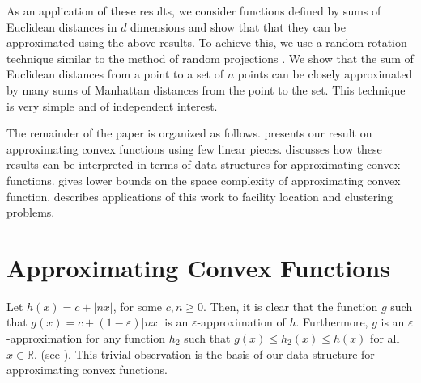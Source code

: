 \documentclass[charterfonts,lotsofwhite]{patmorin}
\newcommand{\eps}{\varepsilon}
\newcommand{\Real}{\mathbb{R}}
\begin{document}
As an application of these results, we consider functions defined by
sums of Euclidean distances in $d$ dimensions and show that that they
can be approximated using the above results.  To achieve this, we use
a random rotation technique similar to the method of random
projections \cite{i01}.  We show that the sum of Euclidean distances
from a point to a set of $n$ points can be closely approximated by
many sums of Manhattan distances from the point to the set.  This
technique is very simple and of independent interest.

The remainder of the paper is organized as follows.  
presents our result on approximating convex functions using few linear
pieces.   discusses how these results can be interpreted in
terms of data structures for approximating convex functions.
 gives lower bounds on the space complexity of
approximating convex function.   describes
applications of this work to facility location and clustering
problems.

\section{Approximating Convex Functions}

Let $h(x)=c+|nx|$, for some $c,n\ge 0$.  Then, it is clear that the
function $g$ such that $g(x)=c+(1-\eps)|nx|$ is an
$\eps$-approximation of $h$.  Furthermore, $g$ is an
$\eps$-approximation for any function $h_2$ such that $g(x)\le
h_2(x)\le h(x)$ for all $x\in\Real$. (see ).  This
trivial observation is the basis of our data structure for
approximating convex functions.
\end{document}
